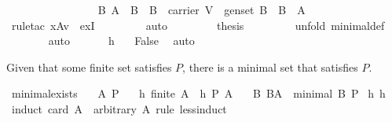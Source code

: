 \begin{isabellebody}
\ \ \isamarkupfalse%
\ {\isacharminus}\ \isanewline
\ \ \ \ \isamarkupfalse%
\ {}\ {}\ {}\ \isamarkupfalse%
\ {}{}{\isacharcolon}\ {\isachardoublequoteopen}{\isacharparenleft}{\isasymexists}B{\isachardot}\ A\ {\isasymsupseteq}\ B\ {\isasymand}\ B\ {\isasymsubseteq}\ carrier\ V\ {\isasymand}\ gen{\isacharunderscore}set\ B\ {\isasymand}\ B\ {\isasymnoteq}\ A{\isacharparenright}{\isachardoublequoteclose}\isanewline
\ \ \ \ \ \ \isamarkupfalse%
\ {\isacharparenleft}rule{\isacharunderscore}tac\ x{\isacharequal}{\isachardoublequoteopen}A{\isacharminus}{\isacharbraceleft}v{\isacharbraceright}{\isachardoublequoteclose}\ \ exI{\isacharparenright}\ \isanewline
\ \ \ \ \ \ \isamarkupfalse%
\ auto\isanewline
\ \ \ \ \isamarkupfalse%
\ {}{}\ \isamarkupfalse%
\ {\isacharquery}thesis\ \isanewline
\ \ \ \ \ \ \isamarkupfalse%
\ {\isacharparenleft}unfold\ minimal{\isacharunderscore}def{\isacharparenright}\ \isanewline
\ \ \ \ \ \ \isamarkupfalse%
\ auto\isanewline
\ \ \isamarkupfalse%
\isanewline
\ \ \isamarkupfalse%
\ h{}\ {}{}\ \isamarkupfalse%
\ False\ \isamarkupfalse%
\ auto\isanewline
{}\isamarkupfalse%
%
\endisatagproof
{\isafoldproof}%
%
\isadelimproof
%
\endisadelimproof
%
\begin{isamarkuptext}%
Given that some finite set satisfies $P$, there is a minimal set that satisfies $P$.%
\end{isamarkuptext}%
\isamarkuptrue%
\isamarkupfalse%
\ minimal{\isacharunderscore}exists{\isacharcolon}\isanewline
\ \ \ A\ P\isanewline
\ \ \ h{}{\isacharcolon}\ {\isachardoublequoteopen}finite\ A{\isachardoublequoteclose}\ \ h{}{\isacharcolon}\ {\isachardoublequoteopen}P\ A{\isachardoublequoteclose}\isanewline
\ \ \ {\isachardoublequoteopen}{\isasymexists}B{\isachardot}\ B{\isasymsubseteq}A\ {\isasymand}\ minimal\ B\ P{\isachardoublequoteclose}\isanewline
%
\isadelimproof
%
\endisadelimproof
%
\isatagproof
{}\isamarkupfalse%
\ h{}\ h{}\ \isanewline
{}\isamarkupfalse%
\ {\isacharparenleft}induct\ {\isachardoublequoteopen}card\ A{\isachardoublequoteclose}\ \ arbitrary{\isacharcolon}\ A\ rule{\isacharcolon}\ less{\isacharunderscore}induct{\isacharparenright}\isanewline

\end{isabellebody}
